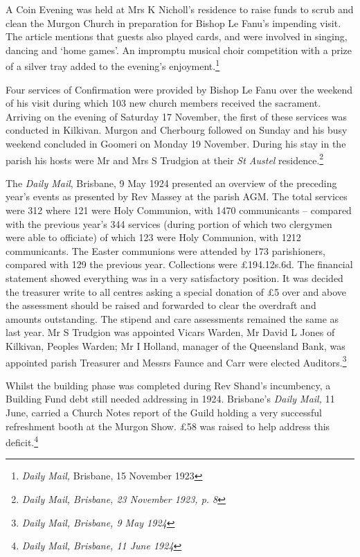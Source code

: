 A Coin Evening was held at Mrs K Nicholl's residence to raise funds to scrub and clean the Murgon Church in preparation for Bishop Le Fanu's impending visit. The article mentions that guests also played cards, and were involved in singing, dancing and `home games'. An impromptu musical choir competition with a prize of a silver tray added to the evening's enjoyment.\footnote{\emph{Daily Mail,} Brisbane, 15 November 1923}

Four services of Confirmation were provided by Bishop Le Fanu over the weekend of his visit during which 103 new church members received the sacrament. Arriving on the evening of Saturday 17 November, the first of these services was conducted in Kilkivan. Murgon and Cherbourg followed on Sunday and his busy weekend concluded in Goomeri on Monday 19 November. During his stay in the parish his hosts were Mr and Mrs S Trudgion at their \emph{St Austel} residence.\footnote{\emph{Daily Mail, Brisbane, 23 November 1923, p. 8}}

The \emph{Daily Mail}, Brisbane, 9 May 1924 presented an overview of the preceding year's events as presented by Rev Massey at the parish AGM. The total services were 312 where 121 were Holy Communion, with 1470 communicants -- compared with the previous year's 344 services (during portion of which two clergymen were able to officiate) of which 123 were Holy Communion, with 1212 communicants. The Easter communions were attended by 173 parishioners, compared with 129 the previous year. Collections were £194.12s.6d. The financial statement showed everything was in a very satisfactory position. It was decided the treasurer write to all centres asking a special donation of £5 over and above the assessment should be raised and forwarded to clear the overdraft and amounts outstanding. The stipend and care assessments remained the same as last year. Mr S Trudgion was appointed Vicars Warden, Mr David L Jones of Kilkivan, Peoples Warden; Mr I Holland, manager of the Queensland Bank, was appointed parish Treasurer and Messrs Faunce and Carr were elected Auditors.\footnote{\emph{Daily Mail, Brisbane, 9 May 1924}}

Whilst the building phase was completed during Rev Shand's incumbency, a Building Fund debt still needed addressing in 1924. Brisbane's \emph{Daily Mail,} 11 June, carried a Church Notes report of the Guild holding a very successful refreshment booth at the Murgon Show. £58 was raised to help address this deficit.\footnote{\emph{Daily Mail, Brisbane, 11 June 1924}}

